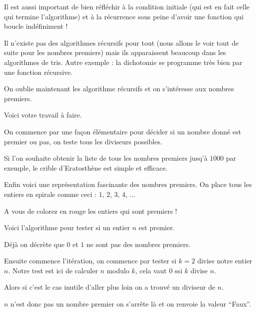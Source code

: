 \change

Il est aussi important de bien réfléchir à la condition initiale (qui est en fait celle qui termine l'algorithme)
  et à la récurrence sous peine d'avoir une fonction qui boucle indéfiniment !
  
\change

Il n'existe pas des algorithmes récursifs pour tout (nous allons le voir tout de suite pour les nombres premiers) 
mais ils apparaissent   beaucoup dans les algorithmes de tris. 
Autre exemple : la dichotomie se programme très bien par une fonction récursive.



\diapo

On oublie maintenant les algorithme récursifs et on s'intéresse aux nombres premiers.

Voici votre travail à faire.

On commence par une façon élémentaire pour décider si un nombre donné est premier  ou pas, on teste
tous les diviseurs possibles.


Si l'on souhaite obtenir la liste de tous les nombres premiers jusq'à $1000$ par exemple, le crible d'Eratosthène
est simple et efficace.



Enfin voici une représentation fascinante des nombres premiers.
On place tous les entiers en spirale comme ceci : $1$, $2$, $3$, $4$, ...

A vous de colorez en rouge les entiers qui sont premiers ! 





\diapo

Voici l'algorithme pour tester si un entier $n$ est premier.

Déjà on décrète que $0$ et $1$ ne sont pas des nombres premiers.

\change

Ensuite commence l'itération, on commence par tester 
si $k=2$ divise notre entier $n$. Notre test est ici de calculer
$n $ modulo $k$, cela vaut $0$ ssi $k$ divise $n$.

Alors si c'est le cas inutile d'aller plus loin on a trouvé un diviseur de $n$.

$n$ n'est donc pas un nombre premier on s’arrête là et on renvoie la valeur ``Faux''.

\change

